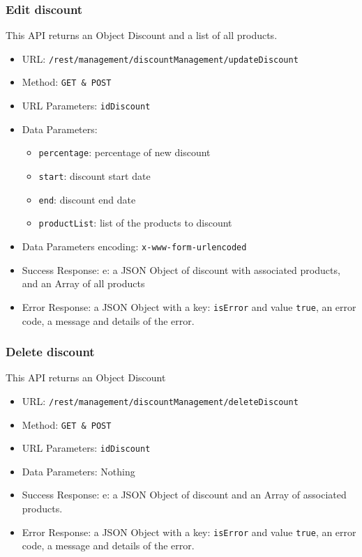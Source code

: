 \subsubsection*{Edit discount}
This API returns an Object Discount and a list of all products.

\begin{itemize}
    \item URL: \texttt{/rest/management/discountManagement/updateDiscount}
    \item Method: \texttt{{GET \& POST}}
    \item URL Parameters: \texttt{idDiscount}
    \item Data Parameters: 
    \begin{itemize}
        \item \texttt{percentage}: percentage of new discount
        \item \texttt{start}: discount start date
        \item \texttt{end}: discount end date
        \item \texttt{productList}: list of the products to discount
    \end{itemize}
    \item Data Parameters encoding: \texttt{x-www-form-urlencoded}
    \item Success Response: e: a JSON Object of discount with associated products, and an Array of all products 
    \item Error Response: a JSON Object with a key: \texttt{isError}  and value \texttt{true}, an error code, a message and details of the error.
\end{itemize}

\subsubsection*{Delete discount}
This API returns an Object Discount

\begin{itemize}
    \item URL: \texttt{/rest/management/discountManagement/deleteDiscount}
    \item Method: \texttt{{GET \& POST}}
    \item URL Parameters: \texttt{idDiscount}
    \item Data Parameters: Nothing
    \item Success Response: e: a JSON Object of discount and an Array of associated products. 
    \item Error Response: a JSON Object with a key: \texttt{isError}  and value \texttt{true}, an error code, a message and details of the error.
\end{itemize}

